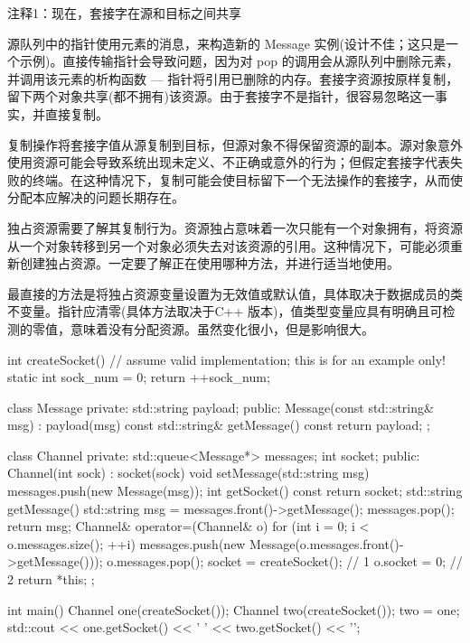 {\footnotesize
注释1：现在，套接字在源和目标之间共享
}


源队列中的指针使用元素的消息，来构造新的 Message 实例(设计不佳；这只是一个示例)。直接传输指针会导致问题，因为对 pop 的调用会从源队列中删除元素，并调用该元素的析构函数 — 指针将引用已删除的内存。套接字资源按原样复制，留下两个对象共享(都不拥有)该资源。由于套接字不是指针，很容易忽略这一事实，并直接复制。

复制操作将套接字值从源复制到目标，但源对象不得保留资源的副本。源对象意外使用资源可能会导致系统出现未定义、不正确或意外的行为；但假定套接字代表失败的终端。在这种情况下，复制可能会使目标留下一个无法操作的套接字，从而使分配本应解决的问题长期存在。

独占资源需要了解其复制行为。资源独占意味着一次只能有一个对象拥有，将资源从一个对象转移到另一个对象必须失去对该资源的引用。这种情况下，可能必须重新创建独占资源。一定要了解正在使用哪种方法，并进行适当地使用。


最直接的方法是将独占资源变量设置为无效值或默认值，具体取决于数据成员的类不变量。指针应清零(具体方法取决于C++ 版本)，值类型变量应具有明确且可检测的零值，意味着没有分配资源。虽然变化很小，但是影响很大。


\begin{cpp}
int createSocket() {
  // assume valid implementation; this is for an example only!
  static int sock_num = 0;
  return ++sock_num;
}

class Message {
private:
  std::string payload;
public:
  Message(const std::string& msg) : payload(msg) {}
  const std::string& getMessage() const { return payload; }
};

class Channel {
private:
  std::queue<Message*> messages;
  int socket;
public:
  Channel(int sock) : socket(sock) {}
  void setMessage(std::string msg) { messages.push(new Message(msg)); }
  int getSocket() const { return socket; }
  std::string getMessage() {
    std::string msg = messages.front()->getMessage();
    messages.pop();
    return msg;
  }
  Channel& operator=(Channel& o) {
    for (int i = 0; i < o.messages.size(); ++i) {
      messages.push(new Message(o.messages.front()->getMessage()));
    o.messages.pop();
    }
    socket = createSocket(); // 1
    o.socket = 0; // 2
    return *this;
  }
};

int main() {
  Channel one(createSocket());
  Channel two(createSocket());
  two = one;
  std::cout << one.getSocket() << ' ' << two.getSocket() << '\n';
}
\end{cpp}

